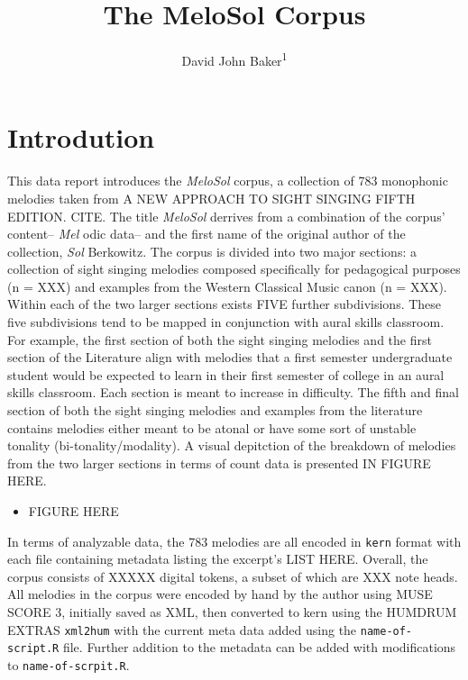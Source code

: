 \documentclass[english,man]{apa6}
\author{David John Baker\textsuperscript{1}}
\affiliation{
\vspace{0.5cm}
\textsuperscript{1} Louisiana State University}
\title{The MeloSol Corpus}
\date{}
\providecommand{\tightlist}{%
  \setlength{\itemsep}{0pt}\setlength{\parskip}{0pt}}
\begin{document}
\maketitle

\hypertarget{introdution}{%
\section{Introdution}\label{introdution}}

This data report introduces the \emph{MeloSol} corpus, a collection of 783 monophonic melodies taken from A NEW APPROACH TO SIGHT SINGING FIFTH EDITION. CITE.
The title \emph{MeloSol} derrives from a combination of the corpus' content-- \emph{Mel} odic data-- and the first name of the original author of the collection, \emph{Sol} Berkowitz.
The corpus is divided into two major sections: a collection of sight singing melodies composed specifically for pedagogical purposes (n = XXX) and examples from the Western Classical Music canon (n = XXX).
Within each of the two larger sections exists FIVE further subdivisions.
These five subdivisions tend to be mapped in conjunction with aural skills classroom.
For example, the first section of both the sight singing melodies and the first section of the Literature align with melodies that a first semester undergraduate student would be expected to learn in their first semester of college in an aural skills classroom.
Each section is meant to increase in difficulty.
The fifth and final section of both the sight singing melodies and examples from the literature contains melodies either meant to be atonal or have some sort of unstable tonality (bi-tonality/modality).
A visual depitction of the breakdown of melodies from the two larger sections in terms of count data is presented IN FIGURE HERE.

\begin{itemize}
\tightlist
\item
  FIGURE HERE
\end{itemize}

In terms of analyzable data, the 783 melodies are all encoded in \texttt{kern} format with each file containing metadata listing the excerpt's LIST HERE.
Overall, the corpus consists of XXXXX digital tokens, a subset of which are XXX note heads.
All melodies in the corpus were encoded by hand by the author using MUSE SCORE 3, initially saved as XML, then converted to kern using the HUMDRUM EXTRAS \texttt{xml2hum} with the current meta data added using the \texttt{name-of-script.R} file.
Further addition to the metadata can be added with modifications to \texttt{name-of-scrpit.R}.
\end{document}
